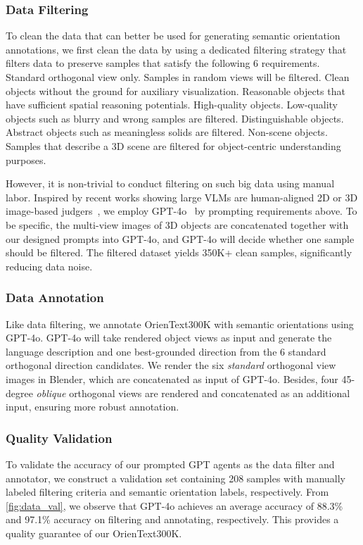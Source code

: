 
\subsubsection{Data Filtering}
To clean the data that can better be used for generating semantic orientation annotations, we first clean the data by using a dedicated filtering strategy that filters data to preserve samples that satisfy the following 6 requirements.
 Standard orthogonal view only. Samples in random views will be filtered.
 Clean objects without the ground for auxiliary visualization.
 Reasonable objects that have sufficient spatial reasoning potentials.
 High-quality objects. Low-quality objects such as blurry and wrong samples are filtered.
 Distinguishable objects. Abstract objects such as meaningless solids are filtered.
 Non-scene objects. Samples that describe a 3D scene are filtered for object-centric understanding purposes.

However, it is non-trivial to conduct filtering on such big data using manual labor.
Inspired by recent works showing large VLMs are human-aligned 2D or 3D image-based judgers~\cite{LLMAsJudge23,GPT4V-3DEvaluator24,DreamBenchPlus24}, we employ GPT-4o~\cite{GPT4o24} by prompting requirements above.
To be specific, the multi-view images of 3D objects are concatenated together with our designed prompts into GPT-4o, and GPT-4o will decide whether one sample should be filtered.
The filtered dataset yields 350K+ clean samples, significantly reducing data noise.


\subsubsection{Data Annotation}
Like data filtering, we annotate OrienText300K with semantic orientations using GPT-4o.
GPT-4o will take rendered object views as input and generate the language description and one best-grounded direction from the 6 standard orthogonal direction candidates.
We render the six \textit{standard} orthogonal view images in Blender, which are concatenated as input of GPT-4o.
Besides, four 45-degree \textit{oblique} orthogonal views are rendered and concatenated as an additional input, ensuring more robust annotation.


\subsubsection{Quality Validation}
To validate the accuracy of our prompted GPT agents as the data filter and annotator, we construct a validation set containing 208 samples with manually labeled filtering criteria and semantic orientation labels, respectively.
From \cref{fig:data_val}, we observe that GPT-4o achieves an average accuracy of 88.3\% and 97.1\% accuracy on filtering and annotating, respectively.
This provides a quality guarantee of our OrienText300K.

